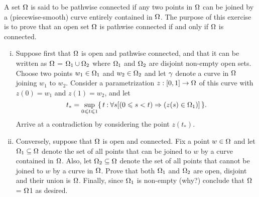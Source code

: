 \documentclass[12pt]{memoir}
\begin{document}
\begin{Ej}
    A set $\Omega$ is said to be pathwise connected if any two points in $\Omega$ can be joined by a (piecewise-smooth) curve entirely contained in $\Omega$. The purpose of this exercise is to prove that an open set $\Omega$ is pathwise connected if and only if $\Omega$ is connected.
    \begin{enumerate}[i)]
        \itemsep=-0.4em
        \item Suppose first that $\Omega$ is open and pathwise connected, and that it can be written as $\Omega$ = $\Omega_1\cup\Omega_2$ where $\Omega_1$ and $\Omega_2$ are disjoint non-empty open sets. Choose two points $w_1\in\Omega_1$ and $w_2\in\Omega_2$ and let $\gamma$ denote a curve in $\Omega$ joining $w_1$ to $w_2$. Consider a parametrization $z:\left\lbrack0,1\right\rbrack\to\Omega$ of this curve with $z(0) = w_1$ and $z(1) = w_2$, and let
        $$t_\ast = \sup_{0\leqslant t\leqslant 1}\{\,t\mathbin{:}\forall s [(0\leqslant s<t)\Rightarrow (z(s)\in\Omega_1)]\,\}.$$
        Arrive at a contradiction by considering the point $z(t_\ast)$.
        \item Conversely, suppose that $\Omega$ is open and connected. Fix a point $w\in\Omega$ and let $\Omega_1\subseteq\Omega$ denote the set of all points that can be joined to $w$ by a curve contained in $\Omega$. Also, let $\Omega_2\subseteq\Omega$ denote the set of all points that cannot be joined to $w$ by a curve in $\Omega$. Prove that both $\Omega_1$ and $\Omega_2$ are open, disjoint and their union is $\Omega$. Finally, since $\Omega_1$ is non-empty (why?) conclude that $\Omega$ = $\Omega$1 as desired.
    \end{enumerate}
    \end{Ej}
\end{document}
